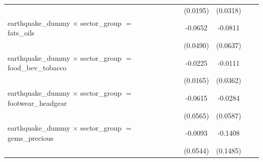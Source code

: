 \begin{tabular}{lcccccccc}
                                                                                  &                       &                       &                       &                       & (0.0195)              & (0.0318)              &                       &   \\   
   earthquake\_dummy $\times$ sector\_group $=$ fats\_oils                        &                       &                       &                       &                       & -0.0652               & -0.0811               &                       &   \\   
                                                                                  &                       &                       &                       &                       & (0.0490)              & (0.0637)              &                       &   \\   
   earthquake\_dummy $\times$ sector\_group $=$ food\_bev\_tobacco                &                       &                       &                       &                       & -0.0225               & -0.0111               &                       &   \\   
                                                                                  &                       &                       &                       &                       & (0.0165)              & (0.0362)              &                       &   \\   
   earthquake\_dummy $\times$ sector\_group $=$ footwear\_headgear                &                       &                       &                       &                       & -0.0615               & -0.0284               &                       &   \\   
                                                                                  &                       &                       &                       &                       & (0.0565)              & (0.0587)              &                       &   \\   
   earthquake\_dummy $\times$ sector\_group $=$ gems\_precious                    &                       &                       &                       &                       & -0.0093               & -0.1408               &                       &   \\   
                                                                                  &                       &                       &                       &                       & (0.0544)              & (0.1485)              &                       &   \\   

\end{tabular}
